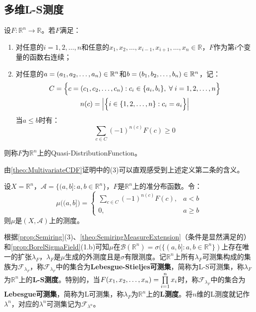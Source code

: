 \subsection{多维L-S测度}
\begin{definition}
	设$F:\mathbb{R}^{n}\to\mathbb{R}$。若$F$满足：
	\begin{enumerate}
		\item 对任意的$i=1,2,\dots,n$和任意的$x_1,x_2,\dots,x_{i-1},x_{i+1},\dots,x_n\in\mathbb{R}$，$F$作为第$i$个变量的函数右连续；
		\item 对任意的$a=(a_1, a_2, \dots, a_{n})\in\mathbb{R}^{n}$和$b=(b_1, b_2, \dots, b_{n})\in\mathbb{R}^{n}$，记：
		\begin{gather*}
			C=\Big\{c=(c_1, c_2, \dots, c_{n}):c_i\in\{a_i,b_i\},\;\forall\;i=1,2,\dots,n\Big\} \\
			n(c)=\Big|\Big\{i\in\{1,2,\dots,n\}:c_i=a_i\Big\}\Big|
		\end{gather*}
		当$a\leqslant b$时有：
		\begin{equation*}
			\sum_{c\in C}(-1)^{n(c)}F(c)\geqslant0
		\end{equation*}
	\end{enumerate}
	则称$F$为$\mathbb{R}^{n}$上的\gls{Quasi-DistributionFunction}。
\end{definition}
\begin{note}
	由\cref{theo:MultivariateCDF}证明中的(3)可以直观感受到上述定义第二条的含义。
\end{note}
\begin{theorem}\label{theo:MultiDimensionalQuasiDistributionMeasure}
	设$X=\mathbb{R}^{n}$，$\mathscr{A}=\{(a,b]:a,b\in\mathbb{R}^{n}\}$，$F$是$\mathbb{R}^{n}$上的准分布函数。令：
	\begin{equation*}
		\mu\Big((a,b]\Big)=
		\begin{cases}
			\sum\limits_{c\in C}(-1)^{n(c)}F(c),&a<b \\
			0,&a\geqslant b
		\end{cases}
	\end{equation*}
	则$\mu$是$(X,\mathscr{A})$上的测度。
\end{theorem}
\begin{definition}
	根据\cref{prop:Semiring}(3)、\cref{theo:SemiringMeasureExtension}（条件是显然满足的）和\cref{prop:BorelSigmaField}(1.b)可知$\mu$在$\mathcal{B}(\mathbb{R}^{n})=\sigma(\{(a,b]:a,b\in\mathbb{R}^{n}\})$上存在唯一的扩张$\lambda_F$，$\lambda_F$是$\mu$生成的外测度且是$\sigma$有限测度。记$\mathbb{R}^{n}$上所有$\lambda_F$可测集构成的集族为$\mathscr{F}_{\lambda_F}$，称$\mathscr{F}_{\lambda_F}$中的集合为\textbf{Lebesgue-Stieljes可测集}，简称为L-S可测集，称$\lambda_F$为$\mathbb{R}^{n}$上的\textbf{L-S测度}。特别的，当$F(x_1, x_2, \dots, x_{n})=\prod\limits_{i=1}^{n}x_i$时，称$\mathscr{F}_{\lambda_F}$中的集合为\textbf{Lebesgue可测集}，简称为L可测集，称$\lambda_F$为$\mathbb{R}^{n}$上的\textbf{L测度}。将$n$维的L测度就记作$\lambda^n$，对应的$\lambda^n$可测集记为$\mathscr{F}_{\lambda^n}$。
	\end{definition}
